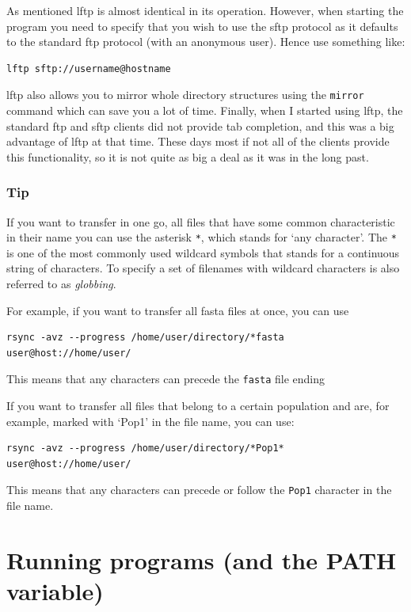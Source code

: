 \documentclass[11pt]{article}
\begin{document}
As mentioned lftp is almost identical in its operation. However, when
starting the program you need to specify that you wish to use the sftp
protocol as it defaults to the standard ftp protocol (with an anonymous
user). Hence use something like:


\begin{verbatim}
lftp sftp://username@hostname
\end{verbatim}

lftp also allows you to mirror whole directory structures using the
\texttt{mirror} command which can save you a lot of time. Finally, when I
started using lftp, the standard ftp and sftp clients did not provide
tab completion, and this was a big advantage of lftp at that time. These
days most if not all of the clients provide this functionality, so it is
not quite as big a deal as it was in the long past.
\subsubsection{Tip}
\label{sec-2-2-3}


If you want to transfer in one go, all files that have some common
characteristic in their name you can use the asterisk \texttt{*}, which
stands for `any character'. The \texttt{*} is one of the most commonly used
wildcard symbols that stands for a continuous string of characters. To
specify a set of filenames with wildcard characters is also referred
to as \emph{globbing}.

For example, if you want to transfer all
fasta files at once, you can use


\begin{verbatim}
rsync -avz --progress /home/user/directory/*fasta user@host://home/user/
\end{verbatim}
This means that any characters can precede the \texttt{fasta} file ending



If you want to transfer all files that belong to a certain population
and are, for example, marked with `Pop1' in the file name, you can use:


\begin{verbatim}
rsync -avz --progress /home/user/directory/*Pop1* user@host://home/user/
\end{verbatim}
This means that any characters can precede or follow the \texttt{Pop1}
character in the file name.
\section{Running programs (and the PATH variable)}
\label{sec-3}
\end{document}
